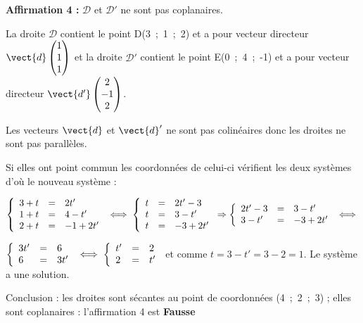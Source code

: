 \textbf{Affirmation 4 :} $\mathcal{D}$ et $\mathcal{D}'$ ne sont pas coplanaires.

La droite $\mathcal{D}$ contient le point D(3~;~1~;~2) et a pour vecteur directeur $\vect{d}\begin{pmatrix}1\\1\\1\end{pmatrix}$ et la droite $\mathcal{D}'$ contient le point E(0~;~4~;~-1) et a pour vecteur directeur $\vect{d'}\begin{pmatrix}2\\-1\\2\end{pmatrix}$.

Les vecteurs $\vect{d}$ et $\vect{d}'$ ne sont pas colinéaires donc les droites ne sont pas parallèles.

Si elles ont point commun les coordonnées de celui-ci vérifient les deux systèmes d'où le nouveau système :

$\left\{\begin{array}{l c l}
3+t&=&2t'\\
1+t&=&4 - t'\\
2+t&=& - 1+ 2t'
\end{array}\right.\iff \left\{\begin{array}{l c l}
t&=&2t' - 3\\
t&=&3 - t'\\
t&=& - 3+ 2t'
\end{array}\right. \Rightarrow \left\{\begin{array}{l c l}
2t' - 3&=&3 - t'\\
3 - t'&=& - 3+ 2t'
\end{array}\right. \iff $

$\left\{\begin{array}{l c l}
3t' &=&6 \\
6&=& 3t'
\end{array}\right. \iff \left\{\begin{array}{l c l}
t' &=&2 \\
2&=& t'
\end{array}\right.$ et comme $t = 3 - t' = 3 - 2 = 1$. Le système a une solution.

Conclusion : les droites  sont sécantes au point de coordonnées (4~;~2~;~3) ; elles sont coplanaires : l'affirmation 4 est \textbf{Fausse}
\bigskip

